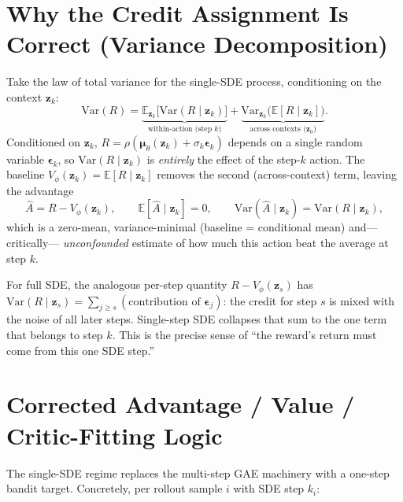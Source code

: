 \documentclass[11pt]{article}
\theoremstyle{plain}
\theoremstyle{remark}
\newcommand{\zt}{\bm{z}}
\newcommand{\E}{\mathbb{E}}
\newcommand{\Var}{\mathrm{Var}}
\newcommand{\Vphi}{V_\phi}
\newcommand{\eps}{\bm{\epsilon}}
\begin{document}
\section{Why the Credit Assignment Is Correct (Variance Decomposition)}
\label{sec:credit}

Take the law of total variance for the single-SDE process, conditioning on the context
$\zt_k$:
\begin{equation}
\Var(R)=\underbrace{\E_{\zt_k}\!\big[\Var(R\mid\zt_k)\big]}_{\text{within-action (step $k$)}}
       +\underbrace{\Var_{\zt_k}\!\big(\E[R\mid\zt_k]\big)}_{\text{across contexts ($\zt_0$)}}.
\end{equation}
Conditioned on $\zt_k$, $R=\rho(\bm\mu_\theta(\zt_k)+\sigma_k\eps_k)$ depends on a single
random variable $\eps_k$, so $\Var(R\mid\zt_k)$ is \emph{entirely} the effect of the
step-$k$ action. The baseline $\Vphi(\zt_k)=\E[R\mid\zt_k]$ removes the second
(across-context) term, leaving the advantage
\begin{equation}
\hat A=R-\Vphi(\zt_k),\qquad \E[\hat A\mid\zt_k]=0,\qquad \Var(\hat A\mid\zt_k)=\Var(R\mid\zt_k),
\end{equation}
which is a zero-mean, variance-minimal (baseline = conditional mean) and---critically---
\emph{unconfounded} estimate of how much this action beat the average at step $k$.

For full SDE, the analogous per-step quantity $R-\Vphi(\zt_s)$ has
$\Var(R\mid\zt_s)=\sum_{j\ge s}(\text{contribution of }\eps_j)$: the credit for step $s$
is mixed with the noise of all later steps. Single-step SDE collapses that sum to the one
term that belongs to step $k$. This is the precise sense of ``the reward's return must
come from this one SDE step.''

\section{Corrected Advantage / Value / Critic-Fitting Logic}
\label{sec:fitting}

The single-SDE regime replaces the multi-step GAE machinery with a one-step bandit
target. Concretely, per rollout sample $i$ with SDE step $k_i$:
\end{document}
